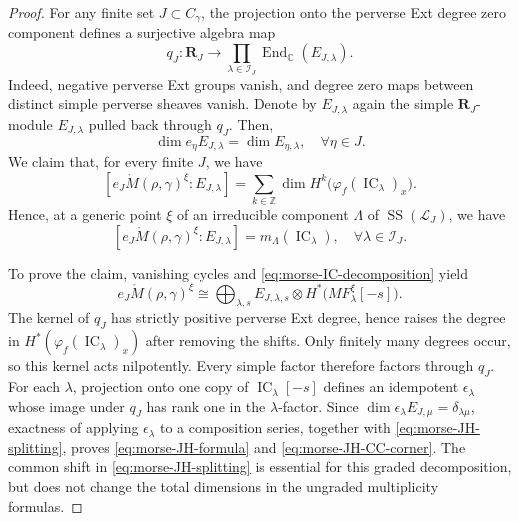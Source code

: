 \documentclass[11pt,reqno]{amsart}
\theoremstyle{definition}
\theoremstyle{remark}
\def\bbC{\mathbb C}
\def\bbZ{\mathbb Z}
\providecommand{\End}{\operatorname{End}}
\def\IC{\operatorname{IC}}
\def\bR{\mathbf R}
\begin{document}
\begin{proof}
For any finite set $J\subset C_\gamma$,
the projection onto the perverse Ext degree zero component defines a surjective algebra map
\begin{equation}\label{eq:morse-semisimple-quotient}
 q_J:\bR_J\longrightarrow
 \prod_{\lambda\in\mathcal I_J}\End_{\bbC}(E_{J,\lambda}).
\end{equation}
Indeed, negative perverse Ext groups vanish, and degree zero maps
between distinct simple perverse sheaves vanish. Denote by $E_{J,\lambda}$ again
the simple $\bR_J$-module $E_{J,\lambda}$ pulled back through $q_J$.
Then, 
\begin{equation}\label{eq:morse-simple-eta-pieces}
 \dim e_\eta E_{J,\lambda}=\dim E_{\eta,\lambda},\quad\forall\eta\in J.
\end{equation}
We claim that, for every finite $J$, we have
\begin{equation}\label{eq:morse-JH-formula}
 [e_J\mathring M(\rho,\gamma)^\xi:E_{J,\lambda}]
 =\sum_{k\in\bbZ}\dim H^k\bigl(\varphi_f(\IC_\lambda)_x\bigr).
\end{equation}
Hence, at a generic point $\xi$ of an irreducible component
$\Lambda$ of $\operatorname{SS}(\mathscr L_J)$, we have
\begin{equation}\label{eq:morse-JH-CC-corner}
 [e_J\mathring M(\rho,\gamma)^\xi:E_{J,\lambda}]=m_\Lambda(\IC_\lambda)
 ,\quad
 \forall\lambda\in\mathcal I_J.
\end{equation}

To prove the claim, vanishing cycles and \eqref{eq:morse-IC-decomposition} yield
\begin{equation}\label{eq:morse-JH-splitting}
 e_J\mathring M(\rho,\gamma)^\xi
 \cong\bigoplus_{\lambda,s}E_{J,\lambda,s}\otimes
 H^*\bigl(MF^\xi_\lambda[-s]\bigr).
\end{equation}
The kernel of $q_J$ has strictly positive perverse Ext degree, hence
raises the degree in $H^*(\varphi_f(\IC_\lambda)_x)$ after
removing the shifts. Only finitely many degrees occur, so this kernel
acts nilpotently. Every simple factor therefore factors through
$q_J$. For each $\lambda$, projection onto one copy of
$\IC_\lambda[-s]$ defines an idempotent $\epsilon_\lambda$
whose image under $q_J$ has rank one in the $\lambda$-factor.
Since $\dim\epsilon_\lambda E_{J,\mu}=\delta_{\lambda\mu}$,
exactness of applying $\epsilon_\lambda$ to a composition series,
together with \eqref{eq:morse-JH-splitting}, proves
\eqref{eq:morse-JH-formula} and \eqref{eq:morse-JH-CC-corner}.
The common shift in \eqref{eq:morse-JH-splitting} is essential for
this graded decomposition, but does not change the total dimensions
in the ungraded multiplicity formulas.


\end{proof}
\end{document}
